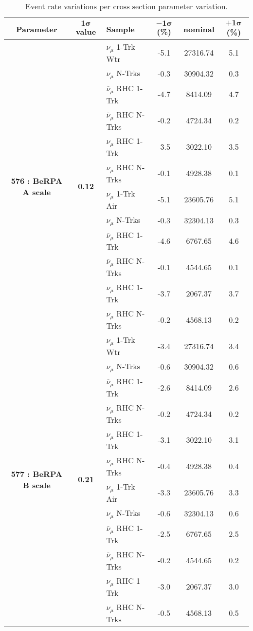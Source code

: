 \addtocounter{table}{-1}
\begin{table}[ht!]
\centering
\begin{tabular}{ c  c  l  c  c  c }
\midrule[1.3pt]
\textbf{Parameter} & \textbf{$\mathbf{1\sigma}$ value} & \textbf{Sample} & \textbf{$\mathbf{-1\sigma}$ (\%)}  &  \textbf{nominal}  &  \textbf{$\mathbf{+1\sigma}$ (\%)} \\
\midrule[1.3pt]
\multirow{12}{*}{\textbf{576 : BeRPA A scale}} & \multirow{12}{*}{\textbf{0.12}} & $\nu_\mu$ 1-Trk Wtr &   -5.1 &  27316.74 &   5.1 \\ 
 &  & $\nu_\mu$ N-Trks &   -0.3 &  30904.32 &   0.3 \\ 
 &  & $\overline{\nu}_\mu$ RHC 1-Trk &   -4.7 &  8414.09 &   4.7 \\ 
 &  & $\overline{\nu}_\mu$ RHC N-Trks &   -0.2 &  4724.34 &   0.2 \\ 
 &  & $\nu_\mu$ RHC 1-Trk &   -3.5 &  3022.10 &   3.5 \\ 
 &  & $\nu_\mu$ RHC N-Trks &   -0.1 &  4928.38 &   0.1 \\ 
 &  & $\nu_\mu$ 1-Trk Air &   -5.1 &  23605.76 &   5.1 \\ 
 &  & $\nu_\mu$ N-Trks &   -0.3 &  32304.13 &   0.3 \\ 
 &  & $\overline{\nu}_\mu$ RHC 1-Trk &   -4.6 &  6767.65 &   4.6 \\ 
 &  & $\overline{\nu}_\mu$ RHC N-Trks &   -0.1 &  4544.65 &   0.1 \\ 
 &  & $\nu_\mu$ RHC 1-Trk &   -3.7 &  2067.37 &   3.7 \\ 
 &  & $\nu_\mu$ RHC N-Trks &   -0.2 &  4568.13 &   0.2 \\ 
\midrule[1.3pt]
\multirow{12}{*}{\textbf{577 : BeRPA B scale}} & \multirow{12}{*}{\textbf{0.21}} & $\nu_\mu$ 1-Trk Wtr &   -3.4 &  27316.74 &   3.4 \\ 
 &  & $\nu_\mu$ N-Trks &   -0.6 &  30904.32 &   0.6 \\ 
 &  & $\overline{\nu}_\mu$ RHC 1-Trk &   -2.6 &  8414.09 &   2.6 \\ 
 &  & $\overline{\nu}_\mu$ RHC N-Trks &   -0.2 &  4724.34 &   0.2 \\ 
 &  & $\nu_\mu$ RHC 1-Trk &   -3.1 &  3022.10 &   3.1 \\ 
 &  & $\nu_\mu$ RHC N-Trks &   -0.4 &  4928.38 &   0.4 \\ 
 &  & $\nu_\mu$ 1-Trk Air &   -3.3 &  23605.76 &   3.3 \\ 
 &  & $\nu_\mu$ N-Trks &   -0.6 &  32304.13 &   0.6 \\ 
 &  & $\overline{\nu}_\mu$ RHC 1-Trk &   -2.5 &  6767.65 &   2.5 \\ 
 &  & $\overline{\nu}_\mu$ RHC N-Trks &   -0.2 &  4544.65 &   0.2 \\ 
 &  & $\nu_\mu$ RHC 1-Trk &   -3.0 &  2067.37 &   3.0 \\ 
 &  & $\nu_\mu$ RHC N-Trks &   -0.5 &  4568.13 &   0.5 \\ 
\midrule[1.3pt]
\end{tabular}
\centering
\caption*{Event rate variations per cross section parameter variation.}
\end{table}
